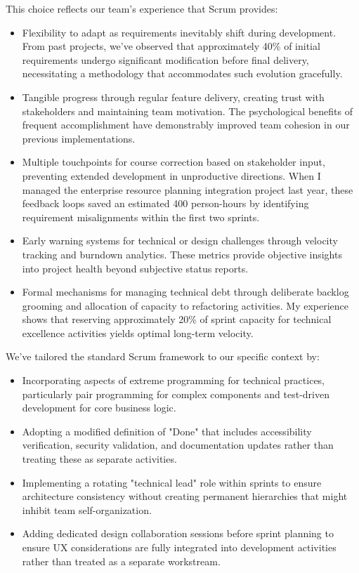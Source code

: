 \documentclass[12pt,a4paper]{article}
\begin{document}
This choice reflects our team's experience that Scrum provides:
\begin{itemize}
    \item Flexibility to adapt as requirements inevitably shift during development. From past projects, we've observed that approximately 40\% of initial requirements undergo significant modification before final delivery, necessitating a methodology that accommodates such evolution gracefully.
    \item Tangible progress through regular feature delivery, creating trust with stakeholders and maintaining team motivation. The psychological benefits of frequent accomplishment have demonstrably improved team cohesion in our previous implementations.
    \item Multiple touchpoints for course correction based on stakeholder input, preventing extended development in unproductive directions. When I managed the enterprise resource planning integration project last year, these feedback loops saved an estimated 400 person-hours by identifying requirement misalignments within the first two sprints.
    \item Early warning systems for technical or design challenges through velocity tracking and burndown analytics. These metrics provide objective insights into project health beyond subjective status reports.
    \item Formal mechanisms for managing technical debt through deliberate backlog grooming and allocation of capacity to refactoring activities. My experience shows that reserving approximately 20\% of sprint capacity for technical excellence activities yields optimal long-term velocity.
\end{itemize}

We've tailored the standard Scrum framework to our specific context by:

\begin{itemize}
    \item Incorporating aspects of extreme programming for technical practices, particularly pair programming for complex components and test-driven development for core business logic.
    \item Adopting a modified definition of "Done" that includes accessibility verification, security validation, and documentation updates rather than treating these as separate activities.
    \item Implementing a rotating "technical lead" role within sprints to ensure architecture consistency without creating permanent hierarchies that might inhibit team self-organization.
    \item Adding dedicated design collaboration sessions before sprint planning to ensure UX considerations are fully integrated into development activities rather than treated as a separate workstream.
\end{itemize}
\end{document}
